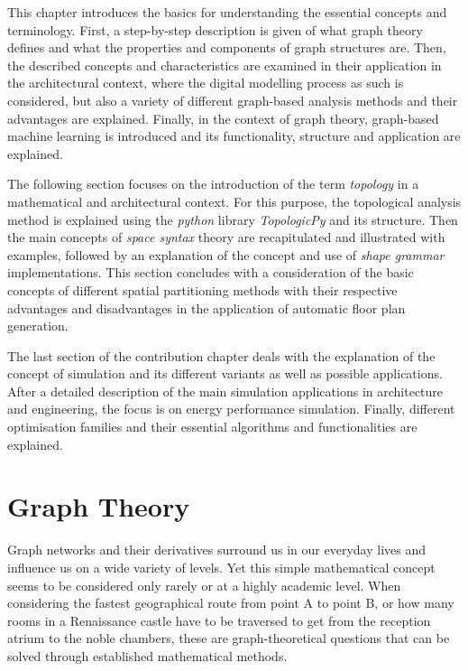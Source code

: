 \documentclass[a4paper, 12pt]{report}
\begin{document}
This chapter introduces the basics for understanding the essential concepts and terminology. First, a step-by-step description is given of what graph theory defines and what the properties and components of graph structures are. Then, the described concepts and characteristics are examined in their application in the architectural context, where the digital modelling process as such is considered, but also a variety of different graph-based analysis methods and their advantages are explained. Finally, in the context of graph theory, graph-based machine learning is introduced and its functionality, structure and application are explained.

The following section focuses on the introduction of the term \textit{topology} in a mathematical and architectural context. For this purpose, the topological analysis method is explained using the \textit{\Gls{python}} library \textit{TopologicPy} and its structure. Then the main concepts of \textit{space syntax} theory are recapitulated and illustrated with examples, followed by an explanation of the concept and use of \textit{shape grammar} implementations. This section concludes with a consideration of the basic concepts of different spatial partitioning methods with their respective advantages and disadvantages in the application of automatic floor plan generation.

The last section of the contribution chapter deals with the explanation of the concept of simulation and its different variants as well as possible applications. After a detailed description of the main simulation applications in architecture and engineering, the focus is on energy performance simulation. Finally, different optimisation families and their essential algorithms and functionalities are explained.

\section{Graph Theory}\label{sec:graph-theory}

Graph networks and their derivatives surround us in our everyday lives and influence us on a wide variety of levels. Yet this simple mathematical concept seems to be considered only rarely or at a highly academic level. When considering the fastest geographical route from point A to point B, or how many rooms in a Renaissance castle have to be traversed to get from the reception atrium to the noble chambers, these are graph-theoretical questions that can be solved through established mathematical methods.
\end{document}
